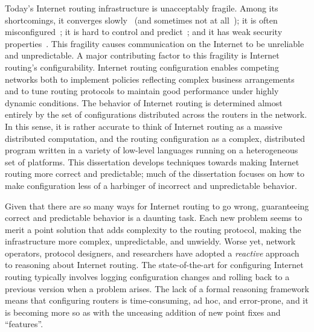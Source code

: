 Today's Internet routing infrastructure is unacceptably fragile.  
Among its shortcomings, it converges slowly~\cite{labovitz:ton01} (and
sometimes not at all~\cite{Griffin2002c}); it is often
misconfigured~\cite{Mahajan2002}; it is hard to control and
predict~\cite{Feamster2003e}; and it has weak security
properties~\cite{id-routing-threats}.  This fragility causes
communication on the Internet to be unreliable and unpredictable. A
major contributing factor to this fragility is Internet routing's
configurability.  Internet routing configuration enables competing
networks both to implement policies reflecting complex business
arrangements and to tune routing protocols to maintain good performance
under highly dynamic conditions.  The behavior of Internet routing is
determined almost entirely by the set of configurations distributed
across the routers in the network.  In this sense, it is rather accurate
to think of Internet routing as a massive distributed computation, and
the routing configuration as a complex, distributed program written in a
variety of low-level languages running on a heterogeneous set of
platforms.  This dissertation develops techniques towards making
Internet routing more correct and predictable; much of the dissertation
focuses on how to make configuration less of a harbinger of incorrect
and unpredictable behavior.

Given that there are so many ways for Internet routing to go wrong,
guaranteeing correct and predictable behavior is a daunting task.  Each
new problem seems to merit a point solution that adds complexity to the
routing protocol, making the infrastructure more complex, unpredictable,
and unwieldy.  Worse yet, network operators, protocol designers, and
researchers have adopted a {\em reactive} approach to reasoning about
Internet routing.  The state-of-the-art for configuring Internet routing
typically involves logging configuration changes and rolling back to a
previous version when a problem arises.  The lack of a formal reasoning
framework means that configuring routers is time-consuming, ad hoc, and
error-prone, and it is becoming more so as with the unceasing addition of
new point fixes and ``features''.

